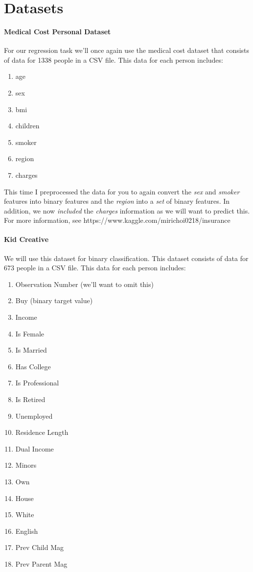 \documentclass[12pt]{article}
\begin{document}
\newpage
\section*{Datasets}
\paragraph{Medical Cost Personal Dataset}
For our regression task we'll once again use the medical cost dataset that consists of data for 1338 people in a CSV file.  This data for each person includes:
\begin{enumerate}
\item age
\item sex
\item bmi
\item children
\item smoker
\item region
\item charges
\end{enumerate}

\noindent
This time I preprocessed the data for you to again convert the \emph{sex} and \emph{smoker} features into binary features and the \emph{region} into a \emph{set} of binary features.  In addition, we now \emph{included} the \emph{charges} information as we will want to predict this.\\

\noindent
For more information, see https://www.kaggle.com/mirichoi0218/insurance

\paragraph{Kid Creative}
We will use this dataset for binary classification.  This dataset consists of data for $673$ people in a CSV file.  This data for each person includes:
\begin{enumerate}
\item Observation Number (we'll want to omit this)
\item Buy (binary target value)
\item Income
\item Is Female
\item Is Married
\item Has College
\item Is Professional
\item Is Retired
\item Unemployed
\item Residence Length
\item Dual Income
\item Minors
\item Own
\item House
\item White
\item English
\item Prev Child Mag
\item Prev Parent Mag
\end{enumerate}
\end{document}
